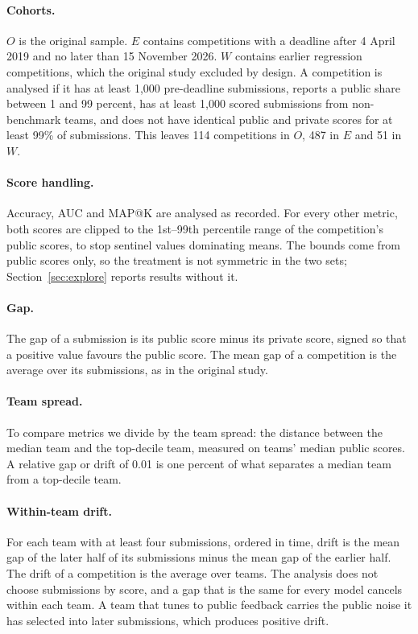 \documentclass[10pt]{article}
\begin{document}
\paragraph{Cohorts.} $O$ is the original sample. $E$ contains competitions with a deadline after 4 April 2019 and no later than 15 November 2026. $W$ contains earlier regression competitions, which the original study excluded by design. A competition is analysed if it has at least 1,000 pre-deadline submissions, reports a public share between 1 and 99 percent, has at least 1,000 scored submissions from non-benchmark teams, and does not have identical public and private scores for at least 99\% of submissions. This leaves 114 competitions in $O$, 487 in $E$ and 51 in $W$.

\paragraph{Score handling.} Accuracy, AUC and MAP@K are analysed as recorded. For every other metric, both scores are clipped to the 1st--99th percentile range of the competition's public scores, to stop sentinel values dominating means. The bounds come from public scores only, so the treatment is not symmetric in the two sets; Section~\ref{sec:explore} reports results without it.

\paragraph{Gap.} The gap of a submission is its public score minus its private score, signed so that a positive value favours the public score. The mean gap of a competition is the average over its submissions, as in the original study.

\paragraph{Team spread.} To compare metrics we divide by the team spread: the distance between the median team and the top-decile team, measured on teams' median public scores. A relative gap or drift of 0.01 is one percent of what separates a median team from a top-decile team.

\paragraph{Within-team drift.} For each team with at least four submissions, ordered in time, drift is the mean gap of the later half of its submissions minus the mean gap of the earlier half. The drift of a competition is the average over teams. The analysis does not choose submissions by score, and a gap that is the same for every model cancels within each team. A team that tunes to public feedback carries the public noise it has selected into later submissions, which produces positive drift.
\end{document}

